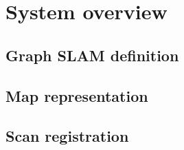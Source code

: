 \chapter{System overview}

\section{Graph SLAM definition}
\subsection{}

\section{Map representation}

\section{Scan registration}
